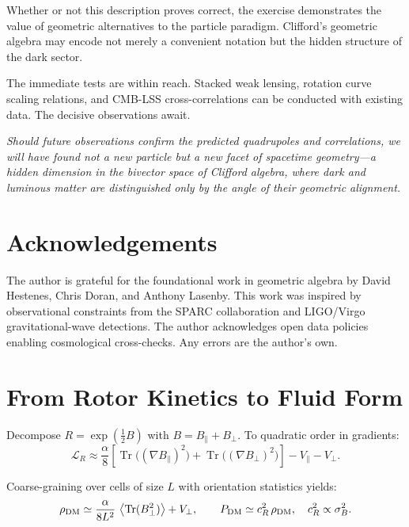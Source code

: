 \documentclass[11pt,a4paper]{article}
\numberwithin{equation}{section}
\theoremstyle{plain}
\theoremstyle{definition}
\theoremstyle{remark}
\DeclareMathOperator{\Tr}{Tr}
\newcommand{\avg}[1]{\left\langle #1 \right\rangle}
\newcommand{\Lag}{\mathcal{L}}              %
\begin{document}
Whether or not this description proves correct, the exercise demonstrates the value of geometric alternatives to the particle paradigm. Clifford's geometric algebra may encode not merely a convenient notation but the hidden structure of the dark sector.

The immediate tests are within reach. Stacked weak lensing, rotation curve scaling relations, and CMB-LSS cross-correlations can be conducted with existing data. The decisive observations await.

\medskip
\noindent\textit{Should future observations confirm the predicted quadrupoles and correlations, we will have found not a new particle but a new facet of spacetime geometry---a hidden dimension in the bivector space of Clifford algebra, where dark and luminous matter are distinguished only by the angle of their geometric alignment.}

\vspace{1em}

\section*{Acknowledgements}

The author is grateful for the foundational work in geometric algebra by David Hestenes, Chris Doran, and Anthony Lasenby. This work was inspired by observational constraints from the SPARC collaboration and LIGO/Virgo gravitational-wave detections. The author acknowledges open data policies enabling cosmological cross-checks. Any errors are the author's own.

\vspace{1em}

\appendix

\section{From Rotor Kinetics to Fluid Form}\label{app:fluid}

Decompose $R=\exp(\tfrac12 B)$ with $B=B_\parallel+B_\perp$. To quadratic order in gradients:
\begin{equation}
\Lag_R \approx \frac{\alpha}{8}\left[\Tr\big((\nabla B_\parallel)^2\big)+\Tr\big((\nabla B_\perp)^2\big)\right]-V_\parallel - V_\perp.
\end{equation}

Coarse-graining over cells of size $L$ with orientation statistics yields:
\begin{equation}
\rho_{\rm DM} \simeq \frac{\alpha}{8L^2}\,\avg{\Tr(B_\perp^2)} + V_\perp,
\qquad
P_{\rm DM}\simeq c_R^2\,\rho_{\rm DM},\quad c_R^2\propto \sigma_B^2.
\end{equation}
\end{document}
